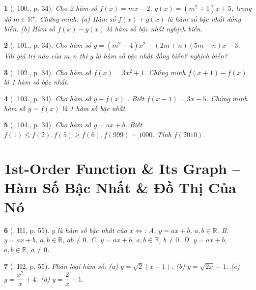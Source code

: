 \documentclass{article}
\newtheorem{baitoan}{}
\begin{document}
\begin{baitoan}[\cite{Tuyen_Toan_9_old}, 100., p. 34]
	Cho 2 hàm số $f(x) = mx - 2$, $g(x) = (m^2 + 1)x + 5$, trong đó $m\in\mathbb{R}^\star$. Chứng minh: (a) Hàm số $f(x) + g(x)$ là hàm số bậc nhất đồng biến. (b) Hàm số $f(x) - g(x)$ là hàm số bậc nhất nghịch biến. 
\end{baitoan}

\begin{baitoan}[\cite{Tuyen_Toan_9_old}, 101., p. 34]
	Cho hàm số $y = (m^2 - 4)x^2 - (2m + n)(5m - n)x - 3$. Với giá trị nào của $m,n$ thì $y$ là hàm số bậc nhất đồng biến? nghịch biến?
\end{baitoan}

\begin{baitoan}[\cite{Tuyen_Toan_9_old}, 102., p. 34]
	Cho hàm số $f(x) = 3x^2 + 1$. Chứng minh $f(x + 1) - f(x)$ là 1 hàm số bậc nhất.
\end{baitoan}

\begin{baitoan}[\cite{Tuyen_Toan_9_old}, 103., p. 34]
	Cho hàm số $y - f(x)$ . Biết $f(x - 1) = 3x - 5$. Chứng minh hàm số $y = f(x)$ là 1 hàm số bậc nhất.
\end{baitoan}

\begin{baitoan}[\cite{Tuyen_Toan_9_old}, 104., p. 34]
	Cho hàm số $y = ax + b$. Biết $f(1)\le f(2),f(5)\ge f(6),f(999) = 1000$. Tính $f(2010)$.
\end{baitoan}


\section{1st-Order Function \& Its Graph -- Hàm Số Bậc Nhất \& Đồ Thị Của Nó}

\begin{baitoan}[\cite{Binh_boi_duong_Toan_9_tap_1}, H1, p. 55]
	$y$ là hàm số bậc nhất của $x\Leftrightarrow$: {\sf A.} $y = ax + b$, $a,b\in\mathbb{R}$. {\sf B.} $y = ax + b$, $a,b\in\mathbb{R}$, $ab\ne0$. {\sf C.} $y = ax + b$, $a,b\in\mathbb{R}$, $b\ne0$. {\sf D.} $y = ax + b$, $a,b\in\mathbb{R}$, $a\ne0$.
\end{baitoan}

\begin{baitoan}[\cite{Binh_boi_duong_Toan_9_tap_1}, H2, p. 55]
	Phân loại hàm số: (a) $y = \sqrt{2}(x - 1)$. (b) $y = \sqrt{2x} - 1$. (c) $y = \dfrac{x^2}{x} + 4$. (d) $y = \dfrac{2}{x} + 1$.
\end{baitoan}
\end{document}
